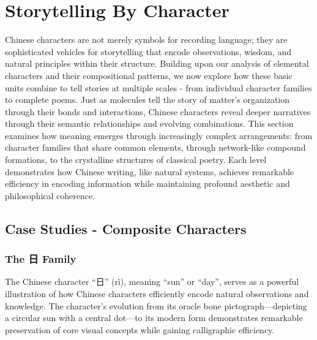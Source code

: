\documentclass[11pt,letterpaper]{article}
\begin{document}
\section{Storytelling By Character}\label{storytelling-by-character}

Chinese characters are not merely symbols for recording language; they
are sophisticated vehicles for storytelling that encode observations,
wisdom, and natural principles within their structure. Building upon our
analysis of elemental characters and their compositional patterns, we
now explore how these basic units combine to tell stories at multiple
scales - from individual character families to complete poems. Just as
molecules tell the story of matter's organization through their bonds
and interactions, Chinese characters reveal deeper narratives through
their semantic relationships and evolving combinations. This section
examines how meaning emerges through increasingly complex arrangements:
from character families that share common elements, through network-like
compound formations, to the crystalline structures of classical poetry.
Each level demonstrates how Chinese writing, like natural systems,
achieves remarkable efficiency in encoding information while maintaining
profound aesthetic and philosophical coherence.

\subsection{Case Studies - Composite Characters}\label{case-studies---composite-characters}

\subsubsection{The 日 Family}\label{the-ux65e5-family}

The Chinese character ``日'' (rì), meaning ``sun'' or ``day'', serves as
a powerful illustration of how Chinese characters efficiently encode
natural observations and knowledge. The character's evolution from its
oracle bone pictograph---depicting a circular sun with a central
dot---to its modern form demonstrates remarkable preservation of core
visual concepts while gaining calligraphic efficiency.
\end{document}
